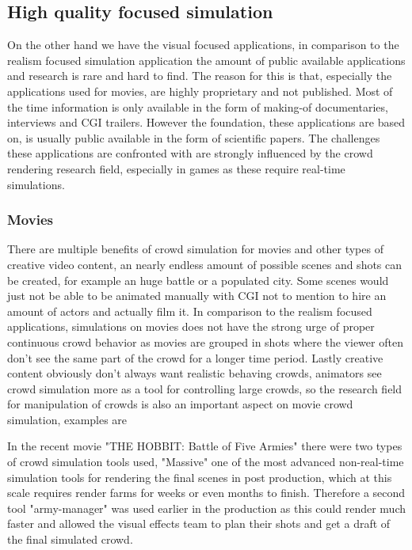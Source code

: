 \documentclass[sigconf]{acmart}
\begin{document}
\subsection{High quality focused simulation}

On the other hand we have the visual focused applications, in comparison to the realism focused simulation application the amount of public available applications and research is rare and hard to find. The reason for this is that, especially the applications used for movies, are highly proprietary and not published. Most of the time information is only available in the form of making-of documentaries, interviews and CGI trailers. 
However the foundation, these applications are based on, is usually public available in the form of scientific papers. The challenges these applications are confronted with are strongly influenced by the crowd rendering research field, especially in games as these require real-time simulations. \cite{thalmann_crowd_2013}

\subsubsection{Movies}

There are multiple benefits of crowd simulation for movies and other types of creative video content, an nearly endless amount of possible scenes and shots can be created, for example an huge battle or a populated city. Some scenes would just not be able to be animated manually with CGI not to mention to hire an amount of actors and actually film it. In comparison to the realism focused applications, simulations on movies does not have the strong urge of proper continuous crowd behavior as movies are grouped in shots where the viewer often don't see the same part of the crowd for a longer time period. Lastly creative content obviously don't always want realistic behaving crowds, animators see crowd simulation more as a tool for controlling large crowds, so the research field for manipulation of crowds is also an important aspect on movie crowd simulation,  examples are \cite{kim_interactive_2014} \cite{ulicny_crowdbrush_2004}

In the recent movie "THE HOBBIT: Battle of Five Armies" there were  two types of crowd simulation tools used, "Massive" one of the most advanced non-real-time simulation tools \cite{massive_website} for rendering the final scenes in post production, which at this scale requires render farms for weeks or even months to finish. Therefore a second tool "army-manager" was used earlier in the production as this could render much faster and allowed the visual effects team to plan their shots and get a draft of the final simulated crowd. \cite{wired_hobbit_doku}
\end{document}
